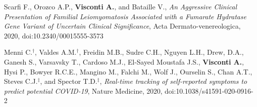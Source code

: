 {\begin{itemize}
		 Scarfi F., Orozco A.P., \textbf{Visconti A.}, and Bataille V., \emph{An Aggressive Clinical Presentation of Familial Leiomyomatosis Associated with a Fumarate Hydratase Gene Variant of Uncertain Clinical Significance}, Acta Dermato-venereologica, 2020, doi:10.2340/00015555-3573
		
		 Menni C.$^{\textbf{$\dag $}}$, Valdes A.M.$^{\textbf{$\dag $}}$, Freidin M.B., Sudre C.H., Nguyen L.H., Drew, D.A., Ganesh S., Varsavsky T., Cardoso M.J., El-Sayed Moustafa J.S., \textbf{Visconti A.}, Hysi P., Bowyer R.C.E., Mangino M., Falchi M., Wolf J., Ourselin S., Chan A.T., Steves C.J.$^{\textbf{$\ddag $}}$, and Spector T.D.$^{\textbf{$\ddag $}}$, \emph{Real-time tracking of self-reported symptoms to predict potential COVID-19}, Nature Medicine, 2020, doi:10.1038/s41591-020-0916-2

				
		\end{itemize}
	}

